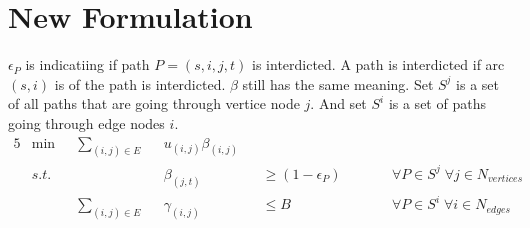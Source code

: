\documentclass{article}
\begin{document}


\section{New Formulation}
$\epsilon_P$ is indicatiing if path $P = (s, i, j, t)$ is interdicted. A path is interdicted if arc $(s,i)$ is of the path is interdicted.
$\beta$ still has the same meaning. Set $S^j$ is a set of all paths that are going through vertice node $j$. And set $S^i$ is a set of paths
going through edge nodes $i$.
\begin{alignat*}{5}
     & \min &  & \sum_{(i,j) \in E} &  & u_{(i,j)}\beta_{(i,j)} &  &                                 &  &                                                 \\
     & s.t. &  &                    &  & \beta_{(j,t)}          &  & \geq (1-\epsilon_P) \quad \quad &  & \forall P \in S^j \; \forall j \in N_{vertices} \\
     &      &  & \sum_{(i,j)\in E}  &  & \gamma_{(i,j)}         &  & \leq B                          &  & \forall P \in S^i \; \forall i \in N_{edges}
\end{alignat*}
\end{document}
